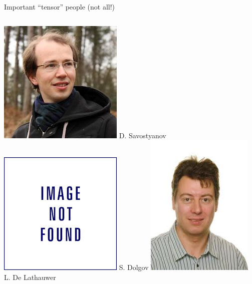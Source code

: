 \documentclass{beamer}[14pt, presentation]
\begin{document}
\begin{frame}[label=sec-1-3]{Important ``tensor'' people (not all!)}
\begin{columns}
\begin{column}{0.25\textwidth}
\includegraphics[height=0.15\textheight]{drraug.jpeg}
\vskip 2mm
{\footnotesize D. Savostyanov}
\vskip 2mm
\includegraphics[height=0.15\textheight]{dolgov.jpeg}
\vskip 2mm
{\footnotesize S. Dolgov}
\vskip 2mm
\includegraphics[height=0.15\textheight]{lathauwer.jpeg}
\vskip 2mm
{\footnotesize L. De Lathauwer}
\end{column}
\end{columns}
\end{frame}
\end{document}
